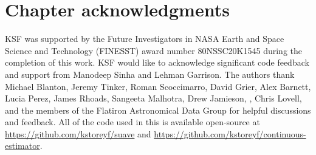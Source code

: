 

\section{Chapter acknowledgments}
KSF was supported by the Future Investigators in NASA Earth and Space Science and Technology (FINESST) award number 80NSSC20K1545 during the completion of this work.
KSF would like to acknowledge significant code feedback and support from Manodeep Sinha and Lehman Garrison.
The authors thank Michael Blanton, Jeremy Tinker, Roman Scoccimarro, David Grier, Alex Barnett,  Lucia Perez, James Rhoads, Sangeeta Malhotra, Drew Jamieson, , Chris Lovell, and the members of the Flatiron Astronomical Data Group for helpful discussions and feedback.
All of the code used in this \documentname is available open-source at \url{https://github.com/kstoreyf/suave} and \url{https://github.com/kstoreyf/continuous-estimator}. 

